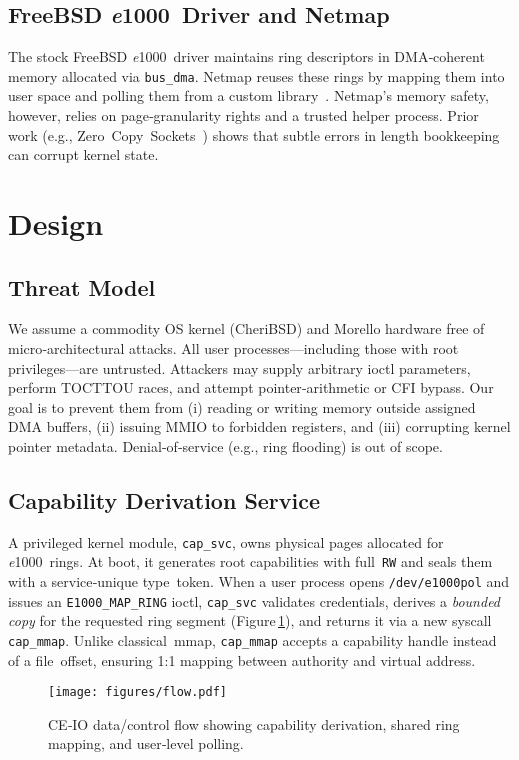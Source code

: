 \documentclass[sigconf]{acmart}
\newcommand{\e}{\textit{e}1000\xspace}
\begin{document}
\subsection{FreeBSD \e Driver and Netmap}
The stock FreeBSD \e driver maintains ring descriptors in DMA‑coherent memory allocated via \texttt{bus\_dma}. Netmap reuses these rings by mapping them into user space and polling them from a custom library \cite{rizzo2012netmap}. Netmap’s memory safety, however, relies on page‑granularity rights and a trusted helper process. Prior work (e.g., Zero Copy Sockets \cite{freebsdZC}) shows that subtle errors in length bookkeeping can corrupt kernel state.  

\section{Design}
\label{sec:design}
\subsection{Threat Model}
We assume a commodity OS kernel (CheriBSD) and Morello hardware free of micro‑architectural attacks. All user processes—including those with root privileges—are untrusted. Attackers may supply arbitrary ioctl parameters, perform TOCTTOU races, and attempt pointer‑arithmetic or CFI bypass. Our goal is to prevent them from (i) reading or writing memory outside assigned DMA buffers, (ii) issuing MMIO to forbidden registers, and (iii) corrupting kernel pointer metadata. Denial‑of‑service (e.g., ring flooding) is out of scope.

\subsection{Capability Derivation Service}
A privileged kernel module, \texttt{cap\_svc}, owns physical pages allocated for \e rings. At boot, it generates root capabilities with full \texttt{RW} and seals them with a service‑unique type token. When a user process opens \texttt{/dev/e1000pol} and issues an \texttt{E1000\_MAP\_RING} ioctl, \texttt{cap\_svc} validates credentials, derives a \emph{bounded copy} for the requested ring segment (Figure\,\ref{fig:flow}), and returns it via a new syscall \texttt{cap\_mmap}. Unlike classical mmap, \texttt{cap\_mmap} accepts a capability handle instead of a file offset, ensuring 1:1 mapping between authority and virtual address.  

\begin{figure}[t]
    \centering
    \texttt{[image: figures/flow.pdf]}
    \caption{CE‑IO data/control flow showing capability derivation, shared ring mapping, and user‑level polling.}
    \label{fig:flow}
\end{figure}
\end{document}
